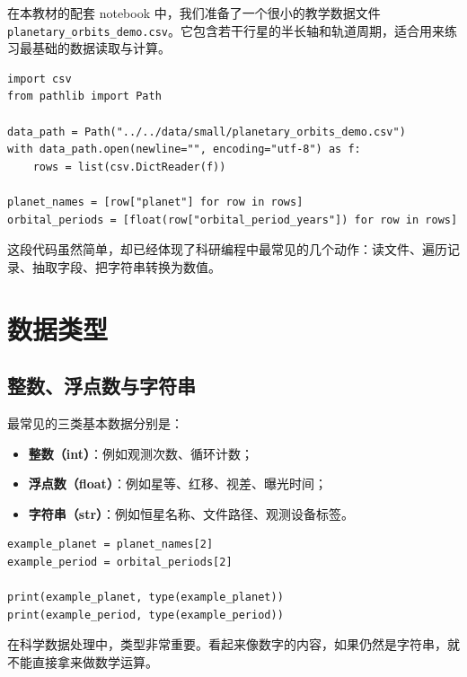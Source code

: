 在本教材的配套 notebook 中，我们准备了一个很小的教学数据文件 \nolinkurl{planetary_orbits_demo.csv}。它包含若干行星的半长轴和轨道周期，适合用来练习最基础的数据读取与计算。

\begin{examplebox}[读取教学数据]
\begin{lstlisting}[style=pythonstyle]
import csv
from pathlib import Path

data_path = Path("../../data/small/planetary_orbits_demo.csv")
with data_path.open(newline="", encoding="utf-8") as f:
    rows = list(csv.DictReader(f))

planet_names = [row["planet"] for row in rows]
orbital_periods = [float(row["orbital_period_years"]) for row in rows]
\end{lstlisting}
\end{examplebox}

这段代码虽然简单，却已经体现了科研编程中最常见的几个动作：读文件、遍历记录、抽取字段、把字符串转换为数值。

\section{数据类型}

\subsection{整数、浮点数与字符串}

最常见的三类基本数据分别是：

\begin{itemize}
    \item \textbf{整数（int）}：例如观测次数、循环计数；
    \item \textbf{浮点数（float）}：例如星等、红移、视差、曝光时间；
    \item \textbf{字符串（str）}：例如恒星名称、文件路径、观测设备标签。
\end{itemize}

\begin{examplebox}[查看变量类型]
\begin{lstlisting}[style=pythonstyle]
example_planet = planet_names[2]
example_period = orbital_periods[2]

print(example_planet, type(example_planet))
print(example_period, type(example_period))
\end{lstlisting}
\end{examplebox}

在科学数据处理中，类型非常重要。看起来像数字的内容，如果仍然是字符串，就不能直接拿来做数学运算。

